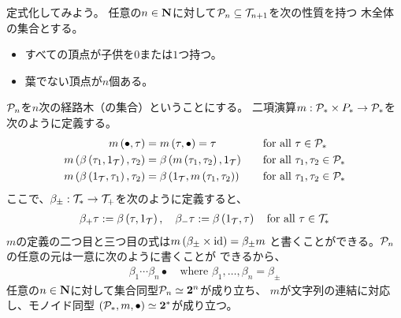 {\begin{todo}[ここまで]
		定式化してみよう。
		任意の$n\in\mathbf{N}$に対して${{\mathcal{P}}}_n\subseteq{\ensuremath{{\mathcal{T}}}}_{n+1}$を次の性質を持つ
		木全体の集合とする。
		\begin{itemize}\setlength{\itemsep}{-1mm} %
			\item すべての頂点が子供を$0$または$1$つ持つ。
			\item 葉でない頂点が$n$個ある。
		\end{itemize} %
		${{\mathcal{P}}}_n$を$n$次の経路木（の集合）ということにする。
		二項演算$m:{{\mathcal{P}}}_*\times P_*\to{\ensuremath{{\mathcal{P}}}}_*$を次のように定義する。
		\begin{alignat*}{2}
			m\left({\bullet,\tau}\right) &= m\left({\tau,\bullet}\right) 
			= \tau &\quad&\text{for all } \tau\in{\ensuremath{{\mathcal{P}}}}_* \\
			m\left({\beta\left({\tau_1,1_{{\mathcal{T}}}}\right),\tau_2}\right)
			&= \beta\left({m\left({\tau_1,\tau_2}\right),1_{{\mathcal{T}}}}\right) 
			&\quad&\text{for all } \tau_1,\tau_2\in{\ensuremath{{\mathcal{P}}}}_* \\
			m\left({\beta\left({1_{{\mathcal{T}}},\tau_1}\right),\tau_2}\right)
			&= \beta\left({1_{{\mathcal{T}}},m\left({\tau_1,\tau_2}\right)}\right) 
			&\quad&\text{for all } \tau_1,\tau_2\in{\ensuremath{{\mathcal{P}}}}_*
		\end{alignat*}
		ここで、$\beta_\pm:{{\mathcal{T}}}_*\to{\ensuremath{{\mathcal{T}}}}_+$を次のように定義すると、
		\begin{equation*}\begin{split}
			\beta_+\tau := \beta\left({\tau,1_{{\mathcal{T}}}}\right),\quad 
			\beta_-\tau := \beta\left({1_{{\mathcal{T}}},\tau}\right)
			\quad\text{for all }\tau\in{\ensuremath{{\mathcal{T}}}}_*
		\end{split}\end{equation*}
		$m$の定義の二つ目と三つ目の式は$m\left({\beta_\pm\times{\ensuremath{\operatorname{id}}}}\right)=\beta_\pm m$
		と書くことができる。${{\mathcal{P}}}_n$の任意の元は一意に次のように書くことが
		できるから、
		\begin{equation*}\begin{split}
			\beta_1\cdots\beta_n\bullet
			\quad\text{where } \beta_1,\dots,\beta_n=\beta_\pm
		\end{split}\end{equation*}
		任意の$n\in\mathbf{N}$に対して集合同型${{\mathcal{P}}}_n\simeq{\ensuremath{\mathbf{2}}}^n$が成り立ち、
		$m$が文字列の連結に対応し、モノイド同型
		$({{\mathcal{P}}}_*,m,\bullet)\simeq{\ensuremath{\mathbf{2}}}^*$が成り立つ。


\end{todo}}
